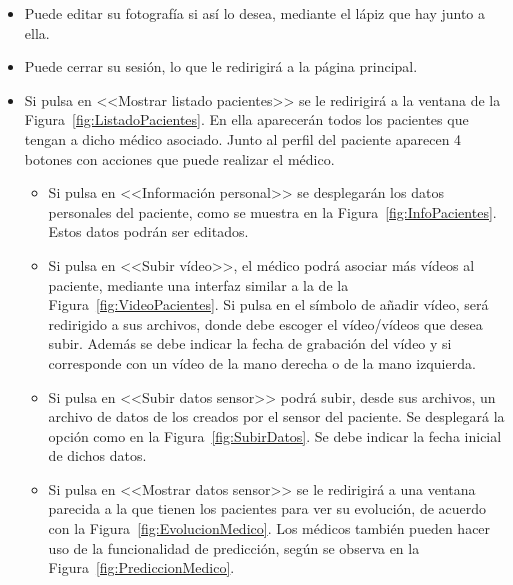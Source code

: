 \begin{itemize}
    \item Puede editar su fotografía si así lo desea, mediante el lápiz que hay junto a ella. 
    \item Puede cerrar su sesión, lo que le redirigirá a la página principal. 
    \item Si pulsa en <<Mostrar listado pacientes>> se le redirigirá a la ventana de la Figura~\ref{fig:ListadoPacientes}.
    En ella aparecerán todos los pacientes que tengan a dicho médico asociado. Junto al perfil del paciente aparecen 4 botones con acciones que puede realizar el médico. 
    \begin{itemize}
        \item Si pulsa en <<Información personal>> se desplegarán los datos personales del paciente, como se muestra en la Figura~\ref{fig:InfoPacientes}. Estos datos podrán ser editados. 
        
        \item Si pulsa en <<Subir vídeo>>, el médico podrá asociar más vídeos al paciente, mediante una interfaz similar a la de la Figura~\ref{fig:VideoPacientes}. Si pulsa en el símbolo de añadir vídeo, será redirigido a sus archivos, donde debe escoger el vídeo/vídeos que desea subir. Además se debe indicar la fecha de grabación del vídeo y si corresponde con un vídeo de la mano derecha o de la mano izquierda.

        \item Si pulsa en <<Subir datos sensor>> podrá subir, desde sus archivos, un archivo de datos de los creados por el sensor del paciente. Se desplegará la opción como en la Figura~\ref{fig:SubirDatos}. Se debe indicar la fecha inicial de dichos datos. 

        \item Si pulsa en <<Mostrar datos sensor>> se le redirigirá a una ventana parecida a la que tienen los pacientes para ver su evolución, de acuerdo con la Figura~\ref{fig:EvolucionMedico}.
        Los médicos también pueden hacer uso de la funcionalidad de predicción, según se observa en la Figura~\ref{fig:PrediccionMedico}.
        
    \end{itemize}
\end{itemize}


